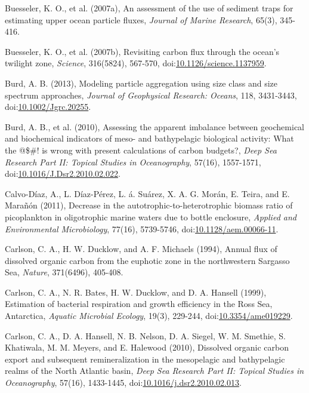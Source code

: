 \begin{singlespace}
{{Buesseler, K. O., et al. (2007a), An assessment of the use of sediment traps for estimating upper ocean particle fluxes, \emph{Journal of Marine Research}, 65(3), 345-416.

Buesseler, K. O., et al. (2007b), Revisiting carbon flux through the ocean's twilight zone, \emph{Science}, 316(5824), 567-570, doi:\href{http://dx.doi.org/10.1126/science.1137959}{10.1126/science.1137959}.

Burd, A. B. (2013), Modeling particle aggregation using size class and size spectrum approaches, \emph{Journal of Geophysical Research: Oceans}, 118, 3431-3443, doi:\href{http://dx.doi.org/10.1002/Jgrc.20255}{10.1002/Jgrc.20255}.

Burd, A. B., et al. (2010), Assessing the apparent imbalance between geochemical and biochemical indicators of meso- and bathypelagic biological activity: What the @\$\#! is wrong with present calculations of carbon budgets?, \emph{Deep Sea Research Part II: Topical Studies in Oceanography}, 57(16), 1557-1571, doi:\href{http://dx.doi.org/10.1016/J.Dsr2.2010.02.022}{10.1016/J.Dsr2.2010.02.022}.

Calvo-D\'{i}az, A., L. D\'{i}az-P\'{e}rez, L. \'{a}. Su\'{a}rez, X. A. G. Mor\'{a}n, E. Teira, and E. Mara\~{n}\'{o}n (2011), Decrease in the autotrophic-to-heterotrophic biomass ratio of picoplankton in oligotrophic marine waters due to bottle enclosure, \emph{Applied and Environmental Microbiology}, 77(16), 5739-5746, doi:\href{http://dx.doi.org/10.1128/aem.00066-11}{10.1128/aem.00066-11}.

Carlson, C. A., H. W. Ducklow, and A. F. Michaels (1994), Annual flux of dissolved organic carbon from the euphotic zone in the northwestern Sargasso Sea, \emph{Nature}, 371(6496), 405-408.

Carlson, C. A., N. R. Bates, H. W. Ducklow, and D. A. Hansell (1999), Estimation of bacterial respiration and growth efficiency in the Ross Sea, Antarctica, \emph{Aquatic Microbial Ecology}, 19(3), 229-244, doi:\href{http://dx.doi.org/10.3354/ame019229}{10.3354/ame019229}.

Carlson, C. A., D. A. Hansell, N. B. Nelson, D. A. Siegel, W. M. Smethie, S. Khatiwala, M. M. Meyers, and E. Halewood (2010), Dissolved organic carbon export and subsequent remineralization in the mesopelagic and bathypelagic realms of the North Atlantic basin, \emph{Deep Sea Research Part II: Topical Studies in Oceanography}, 57(16), 1433-1445, doi:\href{http://dx.doi.org/10.1016/j.dsr2.2010.02.013}{10.1016/j.dsr2.2010.02.013}.

}}
\end{singlespace}
